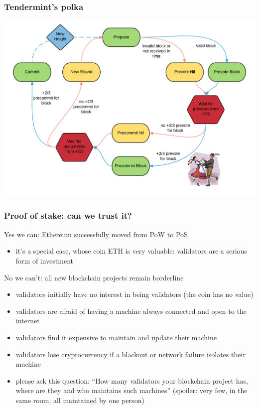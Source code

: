 \documentclass[11pt]{beamer}  %
\begin{document}
\begin{frame}\frametitle{Tendermint's polka}

  \begin{center}
    \includegraphics[scale=.15,clip=false]{pictures/polka.png}
  \end{center}

\end{frame}

\begin{frame}\frametitle{Proof of stake: can we trust it?}

  \begin{greenbox}{Yes we can: Ethereum successfully moved from PoW to PoS}
    \begin{itemize}
    \item it's a special case, whose coin ETH is very valuable: validators are a serious form of investment
    \end{itemize}
  \end{greenbox}

  \bigskip
  
  \begin{redbox}{No we can't: all new blockchain projects remain borderline}
    \begin{itemize}
    \item validators initially have no interest in being validators (the coin has no value)
    \item validators are afraid of having a machine always connected and open to the internet
    \item validators find it expensive to maintain and update their machine
    \item validators lose cryptocurrency if a blackout or network failure isolates their machine
    \item please ask this question: ``How many validators your blockchain project has, where are they and who maintains such machines'' (spoiler: very few, in the same room, all maintained by one person)
    \end{itemize}
  \end{redbox}

\end{frame}
\end{document}
